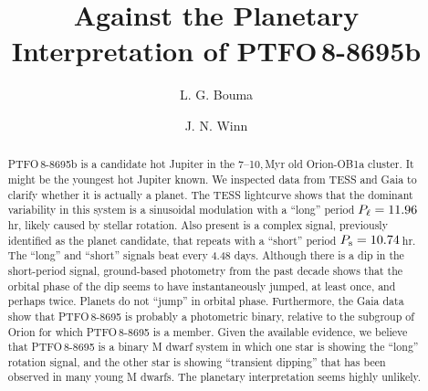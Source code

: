 \documentclass[12pt,twocolumn,tighten]{aastex62}
\begin{document}

\title{Against the Planetary Interpretation of PTFO$\,$8-8695b}


%
%
\author[0000-0002-0514-5538]{L. G. Bouma}
%
\author[0000-0002-4265-047X]{J. N. Winn}

%
%

\begin{abstract}
  PTFO$\,$8-8695b is a candidate hot Jupiter in the 7--10$,$Myr old
  Orion-OB1a cluster. It might be the youngest hot Jupiter known.
  We inspected data from TESS and Gaia to clarify whether it is
  actually a planet.
  The TESS lightcurve shows that the dominant variability in this
  system is a sinusoidal modulation with a ``long'' period $P_{\rm
  \ell}=11.96\,$hr, likely caused by stellar rotation.  Also present
  is a complex signal, previously identified as the planet candidate,
  that repeats with a ``short'' period $P_{\rm s}= 10.74\,$hr.
  The ``long'' and ``short'' signals beat every 4.48 days.
  Although there is a dip in the short-period signal, ground-based
  photometry from the past decade shows that the orbital phase of the
  dip seems to have instantaneously jumped, at least once, and perhaps
  twice.
  Planets do not ``jump'' in orbital phase.
  Furthermore, the Gaia data show that PTFO$\,$8-8695 is probably a
  photometric binary, relative to the subgroup of Orion for which
  PTFO$\,$8-8695 is a member.
  Given the available evidence, we believe that PTFO$\,$8-8695 is a
  binary M dwarf system in which one star is showing the ``long''
  rotation signal, and the other star is showing ``transient dipping''
  that has been observed in many young M dwarfs.
  The planetary interpretation seems highly unlikely.
\end{abstract}
\end{document}
